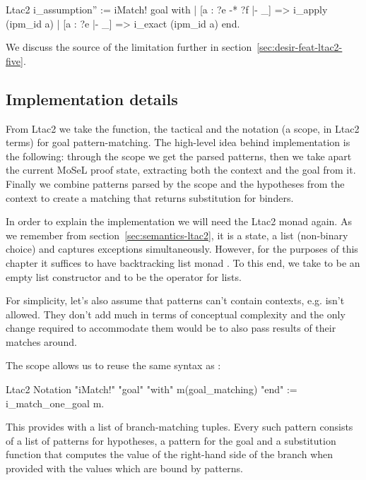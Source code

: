 \begin{itemize}
\begin{minipage}{\linewidth}
\begin{coq}
Ltac2 i_assumption'' :=
  iMatch! goal with
  | [a : ?e -* ?f |- _] => i_apply (ipm_id a)
  | [a : ?e |- _] => i_exact (ipm_id a)
  end.
\end{coq}
\end{minipage}

We discuss the source of the limitation further in section~\ref{sec:desir-feat-ltac2-five}.
\end{itemize}

\subsection{Implementation details}
\label{subsec:implementation_details}

From Ltac2 we take the  function, the  tactical and the notation (a scope, in Ltac2 terms) for goal pattern-matching.
The high-level idea behind implementation is the following: through the scope we get the parsed patterns, then we take apart the current MoSeL proof state, extracting both the context and the goal from it.
Finally we combine patterns parsed by the scope and the hypotheses from the context to create a matching that returns substitution for binders.

In order to explain the implementation we will need the Ltac2 monad again.
As we remember from section~\ref{sec:semantics-ltac2}, it is a state, a list (non-binary choice) and captures exceptions simultaneously.
However, for the purposes of this chapter it suffices to have backtracking list monad .
To this end, we take  to be an empty list constructor
and  to be the  operator for lists.

For simplicity, let's also assume that patterns can't contain contexts, e.g.  isn't allowed.
They don't add much in terms of conceptual complexity and the only change required to accommodate them would be to also pass results of their matches around.

The  scope allows us to reuse the same syntax as :
\begin{coq}
Ltac2 Notation "iMatch!" "goal" "with" m(goal_matching) "end" :=
  i_match_one_goal m.
\end{coq}
This provides  with a list of branch-matching tuples.
Every such pattern consists of a list of patterns for hypotheses, a pattern for the goal and a substitution function that computes the value of the right-hand side of the branch when provided with the values which are bound by patterns.

